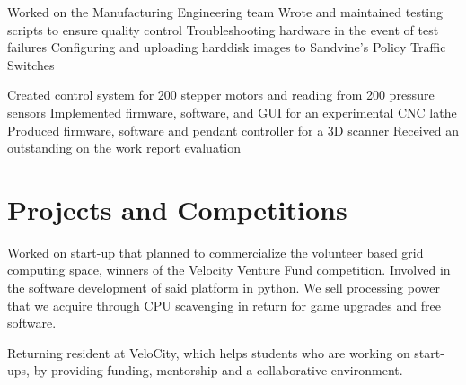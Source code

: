 \documentclass[11pt,a4paper]{moderncv}
\begin{document}
{Worked on the Manufacturing Engineering team
    \newline{}Wrote and maintained testing scripts to ensure quality control
    \newline{}Troubleshooting hardware in the event of test failures
\newline{}Configuring and uploading harddisk images to Sandvine's Policy Traffic Switches\newline{}}

{Created control system for 200 stepper motors and reading from 200 pressure sensors
    \newline{}Implemented firmware, software, and GUI for an experimental CNC lathe
    \newline{}Produced firmware, software and pendant controller for a 3D scanner
\newline{}Received an outstanding on the work report evaluation}

\section{Projects and Competitions}
{Worked on start-up that planned to commercialize the volunteer based grid computing space, winners of the Velocity Venture Fund competition.
\newline{}Involved in the software development of said platform in python.
\newline{}We sell processing power that we acquire through CPU scavenging in return for game upgrades and free software.}

{Returning resident at VeloCity, which helps students who are working on start-ups, by providing funding, mentorship and a collaborative environment.}
\end{document}
